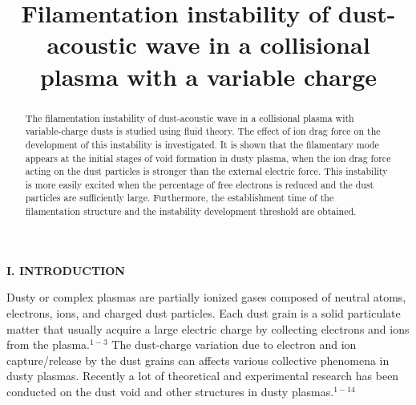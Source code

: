 \renewcommand{\baselinestretch}{1.7}
\textwidth 151mm \textheight 220mm \topmargin -10mm \oddsidemargin
2mm

\begin{titlepage}
\title{Filamentation instability of dust-acoustic wave in a
collisional plasma with a variable charge}

\date{}
\maketitle

\begin{abstract}
The filamentation instability of dust-acoustic wave in a collisional
plasma with variable-charge dusts is studied using fluid theory. The
effect of ion drag force on the development of this instability is
investigated. It is shown that the filamentary mode appears at the
initial stages of void formation in dusty plasma, when the ion drag
force acting on the dust particles is stronger than the external
electric force. This instability is more easily excited when the
percentage of free electrons is reduced and the dust particles are
sufficiently large. Furthermore, the establishment time of the
filamentation structure and the instability development threshold
are obtained.
\end{abstract}
\end{titlepage}
\newpage

\vskip 1cm {\bf\large I. INTRODUCTION} \vskip 0.5cm

Dusty or complex plasmas are partially ionized gases composed of
neutral atoms, electrons, ions, and charged dust particles. Each
dust grain is a solid particulate matter that usually acquire a
large electric charge by collecting electrons and ions from the
plasma.$^{1-3}$ The dust-charge variation due to electron and ion
capture/release by the dust grains can affects various collective
phenomena in dusty plasmas. Recently a lot of theoretical and
experimental research has been conducted on the dust void and other
structures in dusty plasmas.$^{1-14}$

